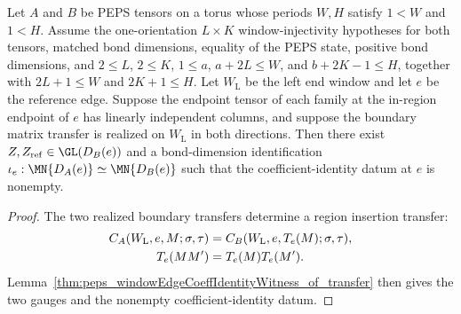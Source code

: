 \begin{lemma}%
    \label{thm:peps_windowEdgeCoeffIdentityWitness_of_realizes}
    \leanok
    Let $A$ and $B$ be PEPS tensors on a torus whose periods $W,H$ satisfy
    $1<W$ and $1<H$. Assume the one-orientation $L\times K$
    window-injectivity hypotheses for both tensors, matched bond dimensions, equality of
    the PEPS state, positive bond dimensions, and
    $2\le L$, $2\le K$, $1\le a$, $a+2L\le W$, and $b+2K-1\le H$,
    together with $2L+1\le W$ and $2K+1\le H$.
    Let $W_{\mathrm L}$ be the left end window and let $e$ be the reference
    edge. Suppose the endpoint tensor of each family at the in-region
    endpoint of $e$ has linearly independent columns, and suppose the boundary
    matrix transfer is realized on $W_{\mathrm L}$ in both directions. Then
    there exist $Z,Z_{\mathrm{ref}}\in\GL(D_B(e))$ and a bond-dimension
    identification $\iota_e:\MN{D_A(e)}\simeq\MN{D_B(e)}$ such that the
    coefficient-identity datum at $e$ is nonempty.
\end{lemma}
\begin{proof}
    \leanok
    The two realized boundary transfers determine a region insertion transfer:
    \begin{align}
        C_A(W_{\mathrm L},e,M;\sigma,\tau)
                 & =
        C_B(W_{\mathrm L},e,T_e(M);\sigma,\tau),
        \notag                     \\
        T_e(MM') & =T_e(M)T_e(M').
        \notag
    \end{align}
    Lemma~\ref{thm:peps_windowEdgeCoeffIdentityWitness_of_transfer} then
    gives the two gauges and the nonempty coefficient-identity datum.
\end{proof}
